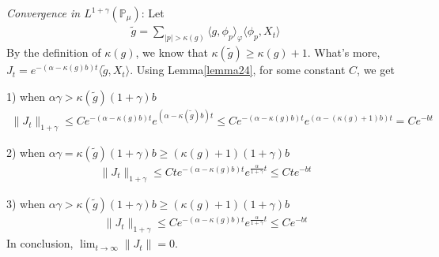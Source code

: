\documentclass[12pt, a4paper]{amsart}
\theoremstyle{definition}
\numberwithin{equation}{section}
\begin{document}
{\em Convergence in $L^{1+\gamma}(\mathbb{P}_{\mu})$}:
Let
\begin{align*}
    \tilde{g}=\sum_{|p|> \kappa(g)}\langle g,\phi_p\rangle_\varphi \langle \phi_p,X_t\rangle
\end{align*}
By the definition of $\kappa(g)$, we know that $\kappa(\tilde{g})\geq \kappa(g)+1$. What's more, $J_t=e^{-(\alpha-\kappa(g)b)t}\langle \tilde{g},X_t\rangle$. 
Using Lemma\ref{lemma24}, for some constant $C$, we get

1) when $\alpha\gamma>\kappa(\tilde{g})(1+\gamma)b$
\begin{align*}
    \|J_t\|_{1+\gamma}\leq C e^{-(\alpha-\kappa(g)b)t}e^{(\alpha-\kappa(\tilde{g})b)t}\leq C  e^{-(\alpha-\kappa(g)b)t}e^{(\alpha-(\kappa(g)+1)b)t}=C e^{-bt}
\end{align*}

2) when $\alpha\gamma=\kappa(\tilde{g})(1+\gamma)b\geq (\kappa(g)+1)(1+\gamma)b$
\begin{align*}
     \|J_t\|_{1+\gamma}\leq C t e^{-(\alpha-\kappa(g)b)t}e^{\frac{\alpha}{1+\gamma}t}\leq C t e^{-bt}
\end{align*}

3) when $\alpha\gamma>\kappa(\tilde{g})(1+\gamma)b\geq (\kappa(g)+1)(1+\gamma)b$
\begin{align*}
    \|J_t\|_{1+\gamma}\leq C e^{-(\alpha-\kappa(g)b)t}e^{\frac{\alpha}{1+\gamma}t}\leq C e^{-bt}
\end{align*}
In conclusion, $\lim_{t\rightarrow \infty}\|J_t\|=0$.
\end{document}
